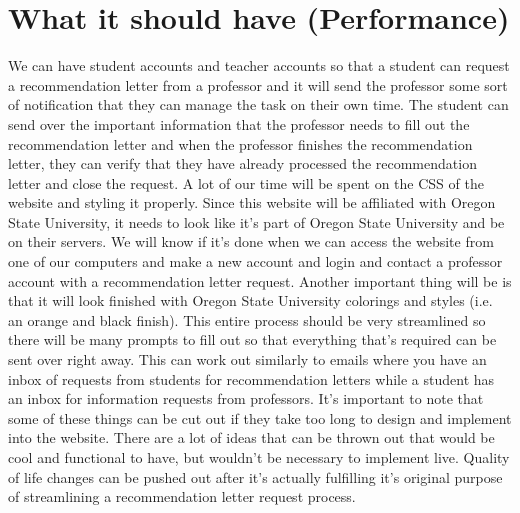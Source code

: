 \documentclass[letterpaper, 10pt, draftclsnofoot, onecolumn, IEEETran]{article}
\begin{document}
\section*{What it should have (Performance)}
 We can have student accounts and teacher accounts so that a student can request a recommendation letter from a professor and it will send the professor some sort of notification that they can manage the task on their own time. The student can send over the important information that the professor needs to fill out the recommendation letter and when the professor finishes the recommendation letter, they can verify that they have already processed the recommendation letter and close the request. A lot of our time will be spent on the CSS of the website and styling it properly. Since this website will be affiliated with Oregon State University, it needs to look like it's part of Oregon State University and be on their servers. We will know if it's done when we can access the website from one of our computers and make a new account and login and contact a professor account with a recommendation letter request. Another important thing will be is that it will look finished with Oregon State University colorings and styles (i.e. an orange and black finish). This entire process should be very streamlined so there will be many prompts to fill out so that everything that's required can be sent over right away. This can work out similarly to emails where you have an inbox of requests from students for recommendation letters while a student has an inbox for information requests from professors. It's important to note that some of these things can be cut out if they take too long to design and implement into the website. There are a lot of ideas that can be thrown out that would be cool and functional to have, but wouldn't be necessary to implement live. Quality of life changes can be pushed out after it's actually fulfilling it's original purpose of streamlining a recommendation letter request process.
\end{document}
